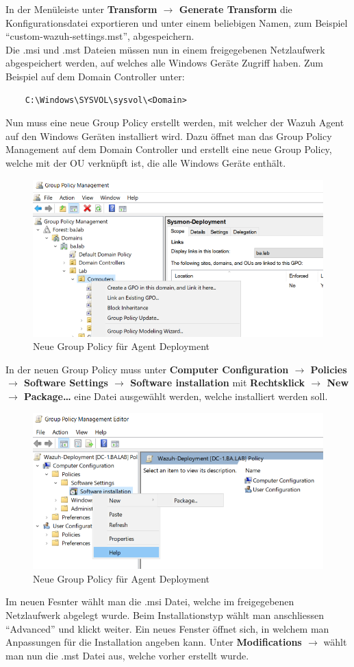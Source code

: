 In der Menüleiste unter \textbf{Transform $\rightarrow$ Generate Transform} die Konfigurationsdatei exportieren und unter einem beliebigen Namen, zum Beispiel ``custom-wazuh-settings.mst'', abgespeichern.\\

Die .msi und .mst Dateien müssen nun in einem freigegebenen Netzlaufwerk abgespeichert werden, auf welches alle Windows Geräte Zugriff haben. Zum Beispiel auf dem Domain Controller unter:
\begin{lstlisting}
    C:\Windows\SYSVOL\sysvol\<Domain>
\end{lstlisting}

Nun muss eine neue Group Policy erstellt werden, mit welcher der Wazuh Agent auf den Windows Geräten installiert wird.
Dazu öffnet man das Group Policy Management auf dem Domain Controller und erstellt eine neue Group Policy, welche mit der OU verknüpft ist, die alle Windows Geräte enthält.
\begin{figure}[H]
    \centering
    \includegraphics[width=0.7\linewidth]{../img/agent/create-new-group-policy.png}
    \caption{Neue Group Policy für Agent Deployment}
\end{figure}

In der neuen Group Policy muss unter \textbf{Computer Configuration $\rightarrow$ Policies $\rightarrow$ Software Settings $\rightarrow$ Software installation} mit \textbf{Rechtsklick $\rightarrow$ New $\rightarrow$ Package\dots} eine Datei ausgewählt werden, welche installiert werden soll.

\begin{figure}[H]
    \centering
    \includegraphics[width=0.7\linewidth]{../img/agent/new-software-install.png}
    \caption{Neue Group Policy für Agent Deployment}
\end{figure}
Im neuen Fesnter wählt man die .msi Datei, welche im freigegebenen Netzlaufwerk abgelegt wurde.
Beim Installationstyp wählt man anschliessen ``Advanced'' und klickt weiter.
Ein neues Fenster öffnet sich, in welchem man Anpassungen für die Installation angeben kann.
Unter \textbf{Modifications $\rightarrow$} wählt man nun die .mst Datei aus, welche vorher erstellt wurde.\\

